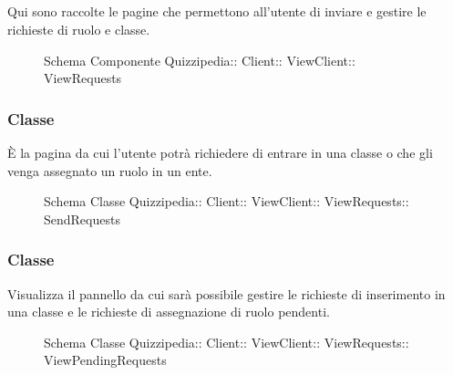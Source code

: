 \subsection{}
Qui sono raccolte le pagine che permettono all'utente di inviare e gestire le richieste di ruolo e classe.
\begin{figure}[H]
\centering
\noindent{}
\caption[Schema Componente Quizzipedia::Client::ViewClient::ViewRequests]{Schema Componente Quizzipedia:: Client:: ViewClient:: ViewRequests}
\end{figure}
\subsubsection{Classe }
È la pagina da cui l'utente potrà richiedere di entrare in una classe o che gli venga assegnato un ruolo in un ente.
\begin{figure}[H]
\centering
\noindent{}
\caption[Schema Classe SendRequests]{Schema Classe Quizzipedia:: Client:: ViewClient:: ViewRequests:: SendRequests}
\end{figure}
\subsubsection{Classe }
Visualizza il pannello da cui sarà possibile gestire le richieste di inserimento in una classe e le richieste di assegnazione di ruolo pendenti.
\begin{figure}[H]
\centering
\noindent{}
\caption[Schema Classe ViewPendingRequests]{Schema Classe Quizzipedia:: Client:: ViewClient:: ViewRequests:: ViewPendingRequests}
\end{figure}
